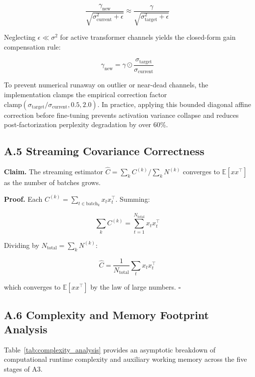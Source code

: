 \[
\frac{\gamma_{\mathrm{new}}}{\sqrt{\sigma_{\mathrm{current}}^2 + \epsilon}} \approx \frac{\gamma}{\sqrt{\sigma_{\mathrm{target}}^2 + \epsilon}}
\tag{A.10}
\]

Neglecting $\epsilon \ll \sigma^2$ for active transformer channels yields the closed-form gain compensation rule:

\[
\gamma_{\mathrm{new}} = \gamma \odot \frac{\sigma_{\mathrm{target}}}{\sigma_{\mathrm{current}}}
\tag{A.11}
\]

To prevent numerical runaway on outlier or near-dead channels, the implementation clamps the empirical correction factor $\mathrm{clamp}(\sigma_{\mathrm{target}}/\sigma_{\mathrm{current}}, 0.5, 2.0)$. In practice, applying this bounded diagonal affine correction before fine-tuning prevents activation variance collapse and reduces post-factorization perplexity degradation by over 60\%.

\subsection{A.5 Streaming Covariance Correctness}

\textbf{Claim.} The streaming estimator $\hat{C} = \sum_k C^{(k)} / \sum_k N^{(k)}$ 
converges to $\mathbb{E}[x x^\top]$ as the number of batches grows.

\textbf{Proof.} Each $C^{(k)} = \sum_{t \in \text{batch}_k} x_t x_t^\top$. Summing:

\[
\sum_k C^{(k)} = \sum_{t = 1}^{N_\text{total}} x_t x_t^\top
\tag{A.14}
\]

Dividing by $N_\text{total} = \sum_k N^{(k)}$:

\[
\hat{C} = \frac{1}{N_\text{total}} \sum_t x_t x_t^\top
\tag{A.15}
\]

which converges to $\mathbb{E}[x x^\top]$ by the law of large numbers. $\square$

\subsection{A.6 Complexity and Memory Footprint Analysis}
\label{sec:app_complexity}

Table~\ref{tab:complexity_analysis} provides an asymptotic breakdown of computational runtime complexity and auxiliary working memory across the five stages of A3.


